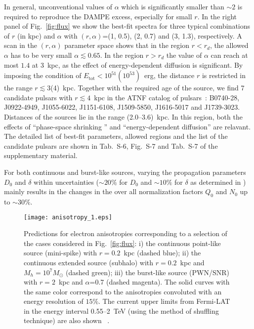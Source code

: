 \documentclass[aps,prl,twocolumn,a4paper]{revtex4}
\newcommand{\note}[1]{#1}{\ignorespacesafterend}
\newcommand{\fig}[1]{Fig.~\ref{#1}}
\begin{document}
In general, unconventional values of  $\alpha$ 
which is  significantly smaller than $\sim 2$ is required to 
reproduce the DAMPE excess, 
especially for small $r$.
In the right panel of  \fig{fig:flux}  we show the best-fit spectra for  
three typical combinations of  $r$ (in kpc) and $\alpha$ with 
$(r,\alpha)$=(1, 0.5), (2, 0.7) and (3, 1.3), respectively.
A scan in the $(r,\alpha)$ parameter space shows that in the region 
$r<r_{d}$, the allowed $\alpha$ has to be very small $\alpha \lesssim0.65$.
In the region $r>r_{d}$ the value of $\alpha$ can reach at most $1.4$ at 3~kpc,
as the effect of  energy-dependent diffusion is  significant.
By imposing the condition of $E_{\text{tot}}<10^{51}(10^{53})$~erg,
the distance $r$ is restricted in the range $r\lesssim$3(4)~kpc.
Together with the required  age of the source,
we find 7 candidate pulsars with $r \lesssim 4$~kpc
in the ATNF catalog of pulsars~\cite{Manchester:2004bp}:
B0740-28, J0922-4949,   J1055-6022,  J1151-6108,
J1509-5850,  J1616-5017 and J1739-3023.
Distances of the sources lie in the range (2.0--3.6)~kpc.
In this region, both the effects of ``phase-space shrinking '' and 
``energy-dependent diffusion'' are relavant.
The detailed list of best-fit parameters, allowed regions
and the list of  the candidate pulsars are shown in
Tab.~S-6, Fig.~S-7 and Tab.~S-7
of the supplementary material. 
%
\note{
For both continuous and burst-like sources, 
varying the propagation parameters
$D_{0}$ and $\delta$ within uncertainties 
($\sim 20\%$ for $D_{0}$ and $\sim10\%$ for $\delta$
as determined in \cite{Trotta:2010mx}) mainly results in 
the changes in the over all normalization factors 
$Q_{0}$ and $N_{0}$ up to $\sim30\%$.
}







\begin{figure}[!thbp]
	\begin{center}
		\texttt{[image: anisotropy\_1.eps]}
		\caption{
			Predictions for electron anisotropies corresponding to 
			a selection of the cases considered in \fig{fig:flux}:
			i) the continuous point-like source (mini-spike) with $r=0.2$~kpc (dashed blue);
			ii) the continuous extended source (subhalo) with $r=0.2$~kpc and $M_{h}=10^{7}M_{\odot}$ (dashed green);
			iii) the burst-like source (PWN/SNR) with $r=2$~kpc and $\alpha$=0.7 (dashed magenta).
			The solid curves with the same color correspond to the anisotropies convoluted with 
			an energy resolution of $15\%$.
			The current upper limits from Fermi-LAT in the  energy interval 0.55--2~TeV
			(using the method of shuffling technique)
			are also shown%
			~\cite{Abdollahi:2017kyf}.
		}
		\label{fig:anisotropy-combined}
	\end{center}
\end{figure}
\end{document}
